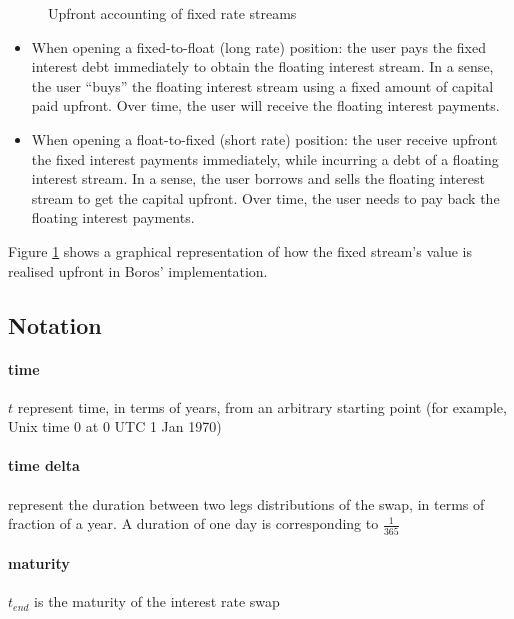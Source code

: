 \documentclass{article}%
\newcommand\streamW{1.25}
\newcommand\streamH{3.5}
\newcommand\padding{0.5}
\newcommand{\streamSep}[2]{
    \draw[black, thick] ({#1 - 2}, #2) node[anchor=south west] {receive} node[anchor=north west] {pay} -- ({#1 + \streamW + \padding}, #2);
}
\begin{document}
\begin{figure}[H]
    \caption{Upfront accounting of fixed rate streams}
    \label{fig:upfrontAccounting}
\end{figure}

\begin{itemize}
    \item When opening a fixed-to-float (long rate) position: the user pays the fixed interest debt immediately to obtain the floating interest stream. In a sense, the user ``buys'' the floating interest stream using a fixed amount of capital paid upfront. Over time, the user will receive the floating interest payments.
    \item When opening a float-to-fixed (short rate) position: the user receive upfront the fixed interest payments immediately, while incurring a debt of a floating interest stream. In a sense, the user borrows and sells the floating interest stream to get the capital upfront. Over time, the user needs to pay back the floating interest payments.
\end{itemize}

Figure \ref{fig:upfrontAccounting} shows a graphical representation of how the fixed stream's value is realised upfront in Boros' implementation.


\subsection{Notation} \label{notation}
\paragraph{time} $t$ represent time, in terms of years, from an arbitrary starting point (for example, Unix time 0 at 0 UTC 1 Jan 1970)
\paragraph{time delta} represent the duration between two legs distributions of the swap, in terms of fraction of a year. A duration of one day is corresponding to $\frac{1}{365}$
\paragraph{maturity} $t_{end}$ is the maturity of the interest rate swap
\end{document}
